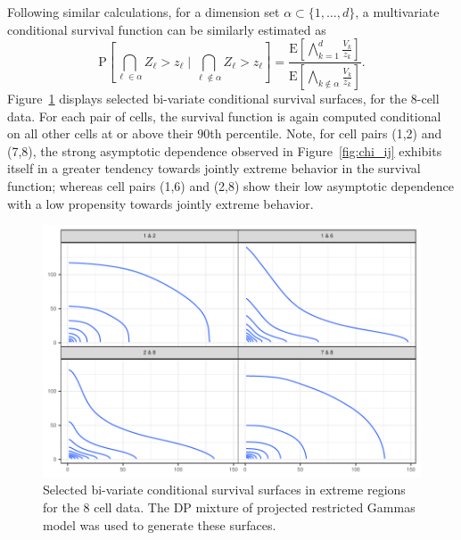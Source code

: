 Following similar calculations, for a dimension set $\alpha \subset \{1,\ldots, d\}$, a multivariate
  conditional survival function can be similarly estimated as
  \begin{equation}
    \label{eqn:condsurv2df}
    \text{P}\left[\bigcap_{\ell \in \alpha} Z_{\ell} > z_{\ell} \mid \bigcap_{\ell\not\in\alpha} Z_{\ell} > z_{\ell}\right] =
      \frac{\text{E}\left[\bigwedge_{k = 1}^d \frac{V_k}{z_k}\right]}{\text{E}\left[\bigwedge_{k \not\in\alpha}\frac{V_k}{z_k}\right]}.
  \end{equation}
  Figure~\ref{fig:condsurv2d} displays selected bi-variate conditional survival surfaces, for the 8-cell
  data.  For each pair of cells, the survival function is again computed conditional on  all other cells
  at or above their $90$th percentile.  Note, for cell pairs (1,2) and (7,8), the strong asymptotic dependence
  observed in Figure~\ref{fig:chi_ij} exhibits itself in a greater tendency towards jointly extreme
  behavior in the survival function; whereas cell pairs (1,6) and (2,8) show their low asymptotic
  dependence with a low propensity towards jointly extreme behavior.

\begin{figure}[t]
  \caption{
    Selected bi-variate conditional survival surfaces in extreme regions for the 8 cell data.
    The DP mixture of projected restricted Gammas model was used to generate these surfaces.
    \label{fig:condsurv2d}
    }
  \includegraphics{./images/condsurv_2d}
\end{figure}










